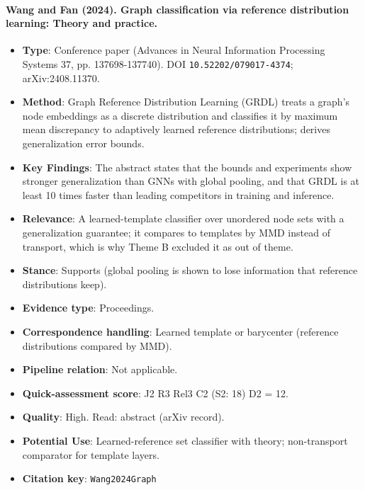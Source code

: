 \documentclass[journal,onecolumn]{IEEEtran}
\begin{document}
\paragraph{Wang and Fan (2024). Graph classification via reference distribution learning: Theory and practice.~\cite{Wang2024Graph}}\mbox{}

\begin{itemize}

\item{} \textbf{Type}: Conference paper (Advances in Neural Information Processing Systems 37, pp. 137698-137740). DOI \nolinkurl{10.52202/079017-4374}; arXiv:2408.11370.

\item{} \textbf{Method}: Graph Reference Distribution Learning (GRDL) treats a graph's node embeddings as a discrete distribution and classifies it by maximum mean discrepancy to adaptively learned reference distributions; derives generalization error bounds.

\item{} \textbf{Key Findings}: The abstract states that the bounds and experiments show stronger generalization than GNNs with global pooling, and that GRDL is at least 10 times faster than leading competitors in training and inference.

\item{} \textbf{Relevance}: A learned-template classifier over unordered node sets with a generalization guarantee; it compares to templates by MMD instead of transport, which is why Theme B excluded it as out of theme.

\item{} \textbf{Stance}: Supports (global pooling is shown to lose information that reference distributions keep).

\item{} \textbf{Evidence type}: Proceedings.

\item{} \textbf{Correspondence handling}: Learned template or barycenter (reference distributions compared by MMD).

\item{} \textbf{Pipeline relation}: Not applicable.

\item{} \textbf{Quick-assessment score}: J2 R3 Rel3 C2 (S2: 18) D2 = 12.

\item{} \textbf{Quality}: High. Read: abstract (arXiv record).

\item{} \textbf{Potential Use}: Learned-reference set classifier with theory; non-transport comparator for template layers.

\item{} \textbf{Citation key}: \texttt{Wang2024Graph}

\end{itemize}
\end{document}

